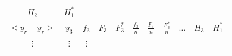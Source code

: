 \documentclass[10pt,]{krantz}
\theoremstyle{definition}
\theoremstyle{definition}
\theoremstyle{definition}
\theoremstyle{definition}
\theoremstyle{remark}
\begin{document}
\begin{longtable}[]{@{}cccccccccll@{}}
\begin{minipage}[t]{0.05\columnwidth}
\(H_2\)\strut
\end{minipage} & \begin{minipage}[t]{0.05\columnwidth}\raggedright
\(H_1^*\)\strut
\end{minipage}\tabularnewline
\begin{minipage}[t]{0.09\columnwidth}\centering
\(<y_{r}-y_r>\)\strut
\end{minipage} & \begin{minipage}[t]{0.05\columnwidth}\centering
\(y_3\)\strut
\end{minipage} & \begin{minipage}[t]{0.05\columnwidth}\centering
\(f_3\)\strut
\end{minipage} & \begin{minipage}[t]{0.05\columnwidth}\centering
\(F_3\)\strut
\end{minipage} & \begin{minipage}[t]{0.05\columnwidth}\centering
\(F_3^*\)\strut
\end{minipage} & \begin{minipage}[t]{0.09\columnwidth}\centering
\(\frac{f_3}{n}\)\strut
\end{minipage} & \begin{minipage}[t]{0.09\columnwidth}\centering
\(\frac{F_3}{n}\)\strut
\end{minipage} & \begin{minipage}[t]{0.10\columnwidth}\centering
\(\frac{F_3^*}{n}\)\strut
\end{minipage} & \begin{minipage}[t]{0.05\columnwidth}\centering
\(\ldots\)\strut
\end{minipage} & \begin{minipage}[t]{0.05\columnwidth}\raggedright
\(H_3\)\strut
\end{minipage} & \begin{minipage}[t]{0.05\columnwidth}\raggedright
\(H_1^*\)\strut
\end{minipage}\tabularnewline
\begin{minipage}[t]{0.09\columnwidth}\centering
\(\vdots\)\strut
\end{minipage} & \begin{minipage}[t]{0.05\columnwidth}\centering
\(\vdots\)\strut
\end{minipage} & \begin{minipage}[t]{0.05\columnwidth}\centering
\(\vdots\)\strut
\end{minipage} & \begin{minipage}[t]{0.05\columnwidth}\centering

\end{minipage}
\end{longtable}
\end{document}
